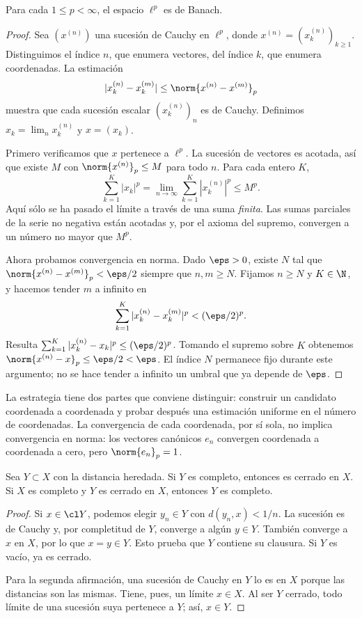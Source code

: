 \begin{teorema}\label{ch08:lp-completo}
Para cada $1\leq p<\infty$, el espacio $\ell^p$ es de Banach.
\end{teorema}
\begin{proof}
Sea $(x^{(n)})$ una sucesión de Cauchy en $\ell^p$, donde $x^{(n)}=(x^{(n)}_k)_{k\geq1}$. Distinguimos el índice $n$, que enumera vectores, del índice $k$, que enumera coordenadas. La estimación
\[
 |x^{(n)}_k-x^{(m)}_k|\leq\norm{x^{(n)}-x^{(m)}}_p
\]
muestra que cada sucesión escalar $(x^{(n)}_k)_n$ es de Cauchy. Definimos $x_k=\lim_nx^{(n)}_k$ y $x=(x_k)$.

Primero verificamos que $x$ pertenece a $\ell^p$. La sucesión de vectores es acotada, así que existe $M$ con $\norm{x^{(n)}}_p\leq M$ para todo $n$. Para cada entero $K$,
\[
 \sum_{k=1}^K|x_k|^p
 =\lim_{n\to\infty}\sum_{k=1}^K|x^{(n)}_k|^p\leq M^p.
\]
Aquí sólo se ha pasado el límite a través de una suma \emph{finita}. Las sumas parciales de la serie no negativa están acotadas y, por el axioma del supremo, convergen a un número no mayor que $M^p$.

Ahora probamos convergencia en norma. Dado $\eps>0$, existe $N$ tal que $\norm{x^{(n)}-x^{(m)}}_p<\eps/2$ siempre que $n,m\geq N$. Fijamos $n\geq N$ y $K\in\N$, y hacemos tender $m$ a infinito en
\[
 \sum_{k=1}^K|x^{(n)}_k-x^{(m)}_k|^p<(\eps/2)^p.
\]
Resulta $\sum_{k=1}^K|x^{(n)}_k-x_k|^p\leq(\eps/2)^p$. Tomando el supremo sobre $K$ obtenemos $\norm{x^{(n)}-x}_p\leq\eps/2<\eps$. El índice $N$ permanece fijo durante este argumento; no se hace tender a infinito un umbral que ya depende de $\eps$.
\end{proof}
La estrategia tiene dos partes que conviene distinguir: construir un candidato coordenada a coordenada y probar después una estimación uniforme en el número de coordenadas. La convergencia de cada coordenada, por sí sola, no implica convergencia en norma: los vectores canónicos $e_n$ convergen coordenada a coordenada a cero, pero $\norm{e_n}_p=1$.

\begin{teorema}\label{ch08:cerrado-completo}
Sea $Y\subset X$ con la distancia heredada. Si $Y$ es completo, entonces es cerrado en $X$. Si $X$ es completo y $Y$ es cerrado en $X$, entonces $Y$ es completo.
\end{teorema}
\begin{proof}
Si $x\in\cl Y$, podemos elegir $y_n\in Y$ con $d(y_n,x)<1/n$. La sucesión es de Cauchy y, por completitud de $Y$, converge a algún $y\in Y$. También converge a $x$ en $X$, por lo que $x=y\in Y$. Esto prueba que $Y$ contiene su clausura. Si $Y$ es vacío, ya es cerrado.

Para la segunda afirmación, una sucesión de Cauchy en $Y$ lo es en $X$ porque las distancias son las mismas. Tiene, pues, un límite $x\in X$. Al ser $Y$ cerrado, todo límite de una sucesión suya pertenece a $Y$; así, $x\in Y$.
\end{proof}

